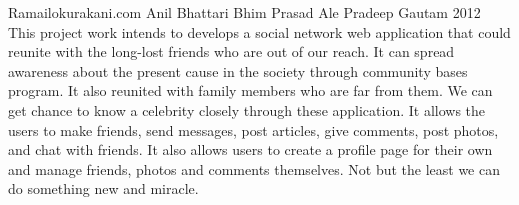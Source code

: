  \begin{conf-abstract}[]
{Ramailokurakani.com}
{
Anil Bhattari
Bhim Prasad Ale
Pradeep Gautam
}	
{2012}
This project work intends to develops a social network web application that could reunite 
with the long-lost friends who are out of our reach. It can spread awareness about the 
present cause in the society through community bases program. It also reunited with
family members who are far from them. We can get chance to know a celebrity closely 
through these application. It allows the users to make friends, send messages, post
articles, give comments, post photos, and chat with friends. It also allows users to create a
profile page for their own and manage friends, photos and comments themselves. Not but
the least we can do something new and miracle.
  \end{conf-abstract}
